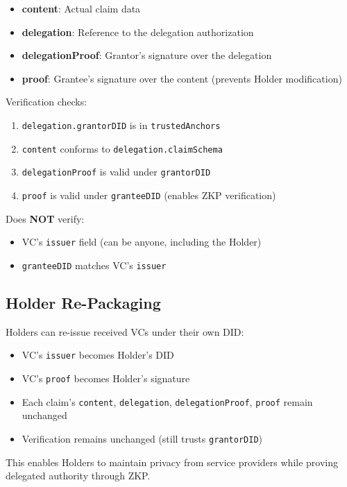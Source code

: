 \begin{itemize}
  \item \textbf{content}: Actual claim data
  \item \textbf{delegation}: Reference to the delegation authorization
  \item \textbf{delegationProof}: Grantor's signature over the delegation
  \item \textbf{proof}: Grantee's signature over the content (prevents Holder modification)
\end{itemize}

Verification checks:
\begin{enumerate}
  \item \texttt{delegation.grantorDID} is in \texttt{trustedAnchors}
  \item \texttt{content} conforms to \texttt{delegation.claimSchema}
  \item \texttt{delegationProof} is valid under \texttt{grantorDID}
  \item \texttt{proof} is valid under \texttt{granteeDID} (enables ZKP verification)
\end{enumerate}

Does \textbf{NOT} verify:
\begin{itemize}
  \item VC's \texttt{issuer} field (can be anyone, including the Holder)
  \item \texttt{granteeDID} matches VC's \texttt{issuer}
\end{itemize}

\subsection{Holder Re-Packaging}

Holders can re-issue received VCs under their own DID:

\begin{itemize}
  \item VC's \texttt{issuer} becomes Holder's DID
  \item VC's \texttt{proof} becomes Holder's signature
  \item Each claim's \texttt{content}, \texttt{delegation}, \texttt{delegationProof}, \texttt{proof} remain unchanged
  \item Verification remains unchanged (still trusts \texttt{grantorDID})
\end{itemize}

This enables Holders to maintain privacy from service providers while proving delegated authority through ZKP.

